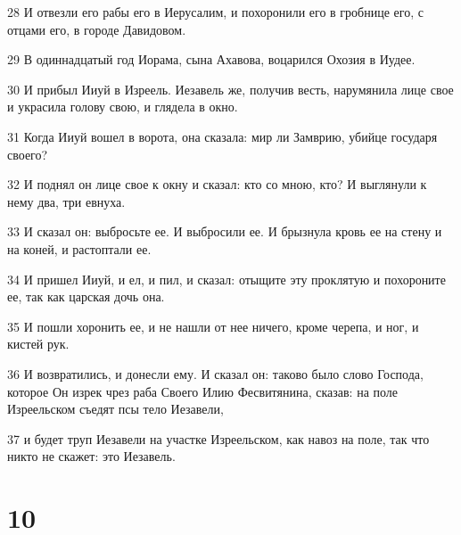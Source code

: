 \par 28 И отвезли его рабы его в Иерусалим, и похоронили его в гробнице его, с отцами его, в городе Давидовом.
\par 29 В одиннадцатый год Иорама, сына Ахавова, воцарился Охозия в Иудее.
\par 30 И прибыл Ииуй в Изреель. Иезавель же, получив весть, нарумянила лице свое и украсила голову свою, и глядела в окно.
\par 31 Когда Ииуй вошел в ворота, она сказала: мир ли Замврию, убийце государя своего?
\par 32 И поднял он лице свое к окну и сказал: кто со мною, кто? И выглянули к нему два, три евнуха.
\par 33 И сказал он: выбросьте ее. И выбросили ее. И брызнула кровь ее на стену и на коней, и растоптали ее.
\par 34 И пришел Ииуй, и ел, и пил, и сказал: отыщите эту проклятую и похороните ее, так как царская дочь она.
\par 35 И пошли хоронить ее, и не нашли от нее ничего, кроме черепа, и ног, и кистей рук.
\par 36 И возвратились, и донесли ему. И сказал он: таково было слово Господа, которое Он изрек чрез раба Своего Илию Фесвитянина, сказав: на поле Изреельском съедят псы тело Иезавели,
\par 37 и будет труп Иезавели на участке Изреельском, как навоз на поле, так что никто не скажет: это Иезавель.

\chapter{10}


